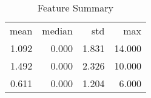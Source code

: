 \begin{table}[ht]
\centering
\caption{Feature Summary} 
\begin{tabular}{rrrr}
 mean & median & std & max \\ 
 1.092 & 0.000 & 1.831 & 14.000 \\ 
   \hline
1.492 & 0.000 & 2.326 & 10.000 \\ 
  0.611 & 0.000 & 1.204 & 6.000 \\ 
  \end{tabular}
  \label{tab:sumfeatures}
\end{table}
